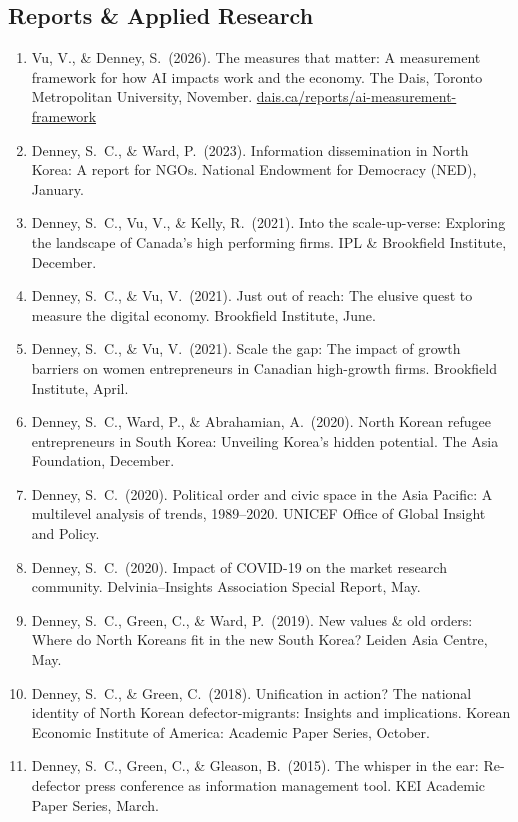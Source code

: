 \documentclass[11pt, a4paper]{article}
\begin{document}
\subsection{Reports \& Applied Research}

\begin{enumerate}[itemsep=0.15em]
  \item Vu, V., \& Denney, S.\ (2026). The measures that matter: A measurement framework for how AI impacts work and the economy. The Dais, Toronto Metropolitan University, November. \href{https://dais.ca/reports/ai-measurement-framework/}{dais.ca/reports/ai-measurement-framework}

  \item Denney, S.\ C., \& Ward, P.\ (2023). Information dissemination in North Korea: A report for NGOs. National Endowment for Democracy (NED), January.

  \item Denney, S.\ C., Vu, V., \& Kelly, R.\ (2021). Into the scale-up-verse: Exploring the landscape of Canada's high performing firms. IPL \& Brookfield Institute, December.

  \item Denney, S.\ C., \& Vu, V.\ (2021). Just out of reach: The elusive quest to measure the digital economy. Brookfield Institute, June.

  \item Denney, S.\ C., \& Vu, V.\ (2021). Scale the gap: The impact of growth barriers on women entrepreneurs in Canadian high-growth firms. Brookfield Institute, April.

  \item Denney, S.\ C., Ward, P., \& Abrahamian, A.\ (2020). North Korean refugee entrepreneurs in South Korea: Unveiling Korea's hidden potential. The Asia Foundation, December.

  \item Denney, S.\ C.\ (2020). Political order and civic space in the Asia Pacific: A multilevel analysis of trends, 1989--2020. UNICEF Office of Global Insight and Policy.

  \item Denney, S.\ C.\ (2020). Impact of COVID-19 on the market research community. Delvinia--Insights Association Special Report, May.

  \item Denney, S.\ C., Green, C., \& Ward, P.\ (2019). New values \& old orders: Where do North Koreans fit in the new South Korea? Leiden Asia Centre, May.

  \item Denney, S.\ C., \& Green, C.\ (2018). Unification in action? The national identity of North Korean defector-migrants: Insights and implications. Korean Economic Institute of America: Academic Paper Series, October.

  \item Denney, S.\ C., Green, C., \& Gleason, B.\ (2015). The whisper in the ear: Re-defector press conference as information management tool. KEI Academic Paper Series, March.
\end{enumerate}
\end{document}
